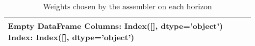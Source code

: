 \begin{table}[H]
\centering
\caption{Weights chosen by the assembler on each horizon}
\label{tab:weights_assembler}
\begin{tabular}{l}
\toprule
Empty DataFrame
Columns: Index([], dtype='object')
Index: Index([], dtype='object') \\
\bottomrule
\end{tabular}
\end{table}
